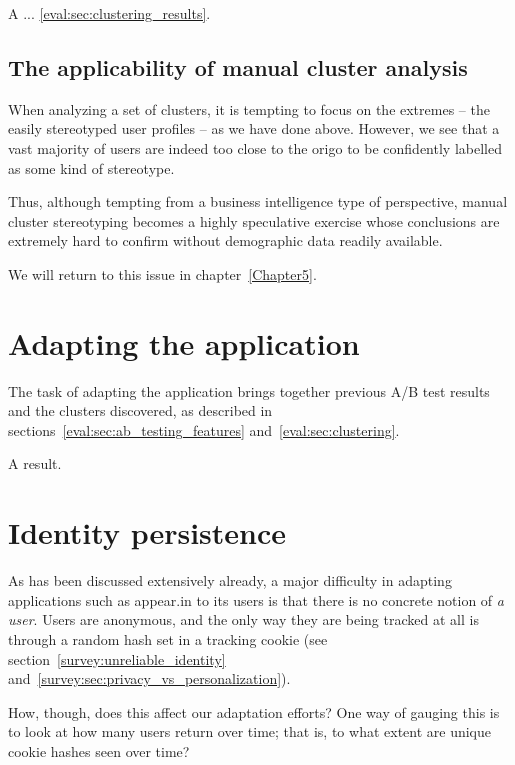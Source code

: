 A ... \ref{eval:sec:clustering_results}.

\subsection{The applicability of manual cluster analysis}
\label{eval:sub:cluster_analysis_applicability}

When analyzing a set of clusters, it is tempting to focus on the extremes -- the easily stereotyped user profiles -- as we have done above. However, we see that a vast majority of users are indeed too close to the origo to be confidently labelled as some kind of stereotype.

Thus, although tempting from a business intelligence type of perspective, manual cluster stereotyping becomes a highly speculative exercise whose conclusions are extremely hard to confirm without demographic data readily available.

We will return to this issue in chapter~\ref{Chapter5}.

\section{Adapting the application} %
\label{eval:sec:adapting_the_application}

The task of adapting the application brings together previous A/B test results and the clusters discovered, as described in sections~\ref{eval:sec:ab_testing_features} and~\ref{eval:sec:clustering}.

\begin{table}
  
  \caption{A result.}
  \label{tab:results}
\end{table}

\section{Identity persistence}
\label{eval:sec:identity_persistence}

As has been discussed extensively already, a major difficulty in adapting applications such as appear.in to its users is that there is no concrete notion of \emph{a user}. Users are anonymous, and the only way they are being tracked at all is through a random hash set in a tracking cookie (see section~\ref{survey:unreliable_identity} and~\ref{survey:sec:privacy_vs_personalization}).

How, though, does this affect our adaptation efforts? One way of gauging this is to look at how many users return over time; that is, to what extent are unique cookie hashes seen over time?

